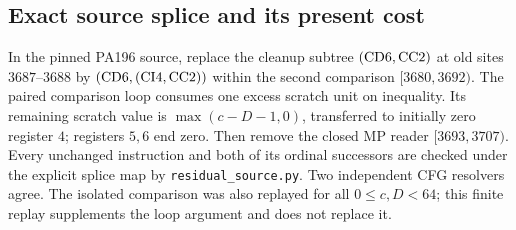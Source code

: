 \subsection{Exact source splice and its present cost}

In the pinned PA196 source, replace the cleanup subtree
$({\rm CD}6,{\rm CC}2)$ at old sites $3687$--$3688$ by
$({\rm CD}6,({\rm CI}4,{\rm CC}2))$ within the second comparison
$[3680,3692)$. The paired comparison loop consumes one excess scratch
unit on inequality. Its remaining scratch value is
$\max(c-D-1,0)$, transferred to initially zero register $4$; registers
$5,6$ end zero. Then remove the closed MP reader $[3693,3707)$.
Every unchanged instruction and both of its ordinal successors are
checked under the explicit splice map by \texttt{residual\_source.py}.
Two independent CFG resolvers agree. The isolated comparison was also
replayed for all $0\le c,D<64$; this finite replay supplements the loop
argument and does not replace it.

